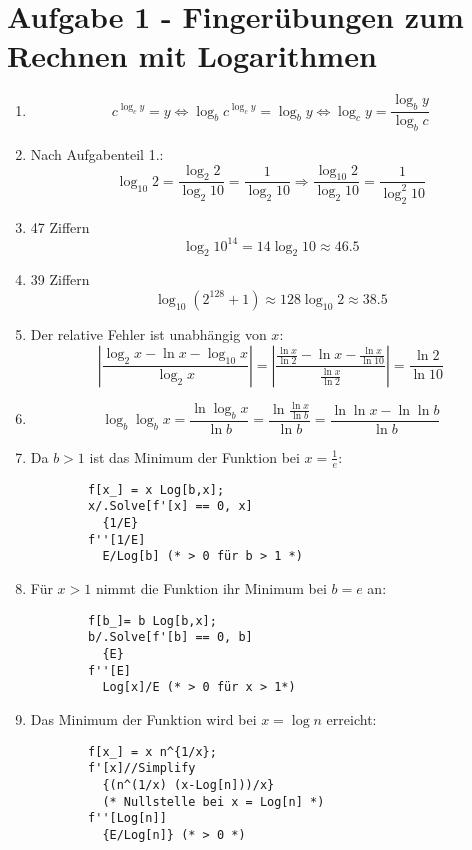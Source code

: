 \section*{Aufgabe 1 - Fingerübungen zum Rechnen mit Logarithmen}

\begin{enumerate}
\item
	\[ c^{\log_c y} = y \Leftrightarrow 
	\log_b c^{\log_c y} = \log_b y \Leftrightarrow \log_c y =
	\frac{\log_b y}{\log_b c}\]
\item Nach Aufgabenteil 1.:
	\[ \log_{10} 2 = \frac{\log_2 2}{\log_2 10} = \frac{1}{\log_2 10} \Rightarrow \frac{\log_{10} 2}{\log_2 10} = \frac{1}{\log_2^2 10} \]

\item 47 Ziffern \[ \log_2 10^{14} = 14 \log_2 10 \approx 46.5 \]

\item 39 Ziffern \[ \log_{10} (2^{128} + 1) \approx 128 \log_{10} 2 \approx 38.5 \]

\item Der relative Fehler ist unabhängig von $x$:
	\[ \left| \frac{\log_2 x - \ln x - \log_{10} x}{\log_2 x} \right| =
	\left| \frac{\frac{\ln x}{\ln 2} - \ln x - \frac{\ln x}{\ln 10}}{\frac{\ln x}{\ln 2}} \right| = \frac{\ln 2}{\ln 10} \]

\item
	\[ \log_b \log_b x = \frac{\ln \log_b x}{\ln b} = \frac{\ln \frac{\ln x}{\ln b}}{\ln b} = \frac{\ln \ln x - \ln \ln b}{\ln b}\]

\item Da $b > 1$ ist das Minimum der Funktion bei $x = \frac{1}{e}$:
	\lstset{language=Mathematice}
	\begin{lstlisting}
		f[x_] = x Log[b,x];
		x/.Solve[f'[x] == 0, x]
		  {1/E}
		f''[1/E]
		  E/Log[b] (* > 0 für b > 1 *)
	\end{lstlisting}

\item Für $x > 1$ nimmt die Funktion ihr Minimum bei $b = e$ an:
	\begin{lstlisting}
		f[b_]= b Log[b,x];
		b/.Solve[f'[b] == 0, b]
		  {E}
		f''[E]
		  Log[x]/E (* > 0 für x > 1*)
	\end{lstlisting}

\item Das Minimum der Funktion wird bei $x = \log n$ erreicht:
	\begin{lstlisting}
		f[x_] = x n^{1/x};
		f'[x]//Simplify
		  {(n^(1/x) (x-Log[n]))/x}
		  (* Nullstelle bei x = Log[n] *)
		f''[Log[n]]
		  {E/Log[n]} (* > 0 *)
	\end{lstlisting}


\end{enumerate}
